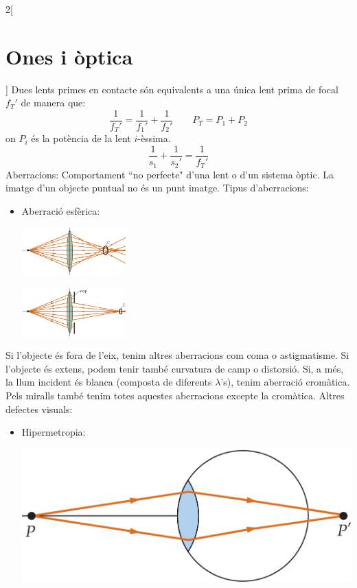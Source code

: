 \documentclass[../../../main.tex]{subfiles}
\begin{document}
\begin{multicols}{2}[\section{Ones i òptica}]
Dues lents primes en contacte són equivalents a una única lent prima de focal $f_T'$ de manera que: $$\frac{1}{f_T'}=\frac{1}{f_1'}+\frac{1}{f_2'}\qquad P_T=P_1+P_2$$ {\footnotesize on $P_i$ és la potència de la lent $i$-èssima.}
$$\frac{1}{s_1}+\frac{1}{s_2'}=\frac{1}{f_T'}$$
Aberracions: Comportament ``no perfecte" d'una lent o d'un sistema òptic. La imatge d'un objecte puntual no és un punt imatge.
Tipus d'aberracions:
\begin{itemize}
    \item Aberració esfèrica:\newline
    \begin{minipage}{\linewidth}
       \centering \includegraphics[width=4cm]{Physics/1st/Waves_and_optics/Images/aberr1.jpg}
    \end{minipage}
    \begin{minipage}{\linewidth}
       \centering \includegraphics[width=4cm]{Physics/1st/Waves_and_optics/Images/aberr2.jpg} 
    \end{minipage}
\end{itemize} 
    Si l'objecte és fora de l'eix, tenim altres aberracions com coma o astigmatisme.\newline 
    Si l'objecte és extens, podem tenir també curvatura de camp o distorsió.\newline 
Si, a més, la llum incident és blanca (composta de diferents $\lambda$'s), tenim aberració cromàtica.\newline
Pels miralls també tenim totes aquestes aberracions excepte la cro\-mà\-ti\-ca.\newline
Altres defectes visuals:
\begin{itemize}
    \item Hipermetropia:\newline
    \begin{minipage}{\linewidth}
        \includegraphics[width=\linewidth]{Physics/1st/Waves_and_optics/Images/hip.jpg} 

\end{minipage}
\end{itemize}
\end{multicols}
\end{document}
